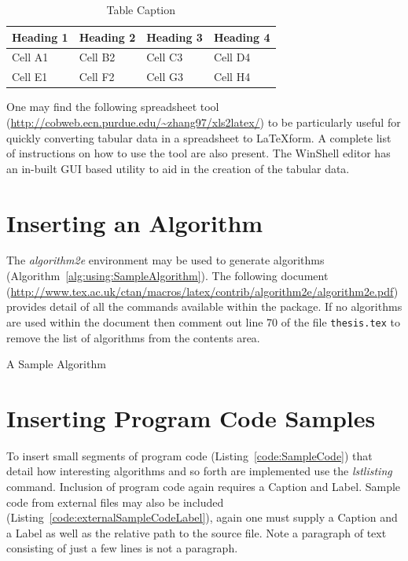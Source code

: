 \begin{table}[H]
\centering
\small
\begin{tabular}{llll}
\toprule \textbf{Heading 1}& \textbf{Heading 2}&\textbf{Heading 3}&\textbf{Heading 4}\\
\midrule
Cell A1 & Cell B2 & Cell C3 & Cell D4\\
Cell E1 & Cell F2 & Cell G3 & Cell H4\\
\bottomrule
\end{tabular}
\caption{Table Caption}\label{tab:using:TableExample}
\end{table}



One may find the following spreadsheet tool (\url{http://cobweb.ecn.purdue.edu/~zhang97/xls2latex/}) to be particularly useful for quickly converting tabular data in a spreadsheet to \LaTeX \space form. A complete list of instructions on how to use the tool are also present. The WinShell editor has an in-built GUI based utility to aid in the creation of the tabular data.

\section{Inserting an Algorithm}

The \emph{algorithm2e} environment may be used to generate algorithms (Algorithm~\ref{alg:using:SampleAlgorithm}). The following document (\url{http://www.tex.ac.uk/ctan/macros/latex/contrib/algorithm2e/algorithm2e.pdf}) provides detail of all the commands available within the package. If no algorithms are used within the document then comment out line 70 of the file {\tt thesis.tex} to remove the list of algorithms from the contents area.

\begin{algorithm}
{}
\caption{A Sample Algorithm} \label{alg:using:SampleAlgorithm}
\end{algorithm}

\section{Inserting Program Code Samples}

To insert small segments of program code (Listing~\ref{code:SampleCode}) that detail how interesting algorithms and so forth are implemented use the \emph{lstlisting} command. Inclusion of program code again requires a Caption and Label. Sample code from external files may also be included (Listing~\ref{code:externalSampleCodeLabel}), again one must supply a Caption and a Label as well as the relative path to the source file. Note a paragraph of text consisting of just a few lines is not a paragraph.

